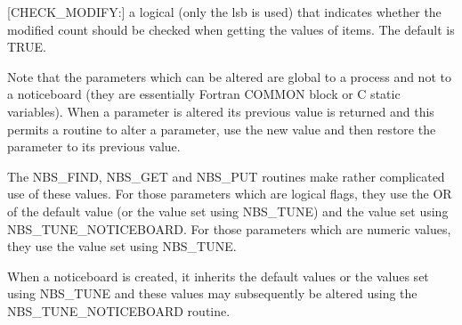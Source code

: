 \begin{small}
{{      [CHECK\_MODIFY:] a logical (only the lsb is used) that indicates whether
         the modified count should be checked when getting the values of items.
         The default is TRUE.

      Note that the parameters which can be altered are global to a process and
      not to a noticeboard (they are essentially Fortran COMMON block or C
      static variables). When a parameter is altered its previous value is
      returned and this permits a routine to alter a parameter, use the new
      value and then restore the parameter to its previous value.

      The NBS\_FIND, NBS\_GET and NBS\_PUT routines make rather complicated use of
      these values. For those parameters which are logical flags, they use
      the OR of the default value (or the value set using NBS\_TUNE) and the
      value set using NBS\_TUNE\_NOTICEBOARD. For those parameters which are
      numeric values, they use the value set using NBS\_TUNE.

      When a noticeboard is created, it inherits the default values or the
      values set using NBS\_TUNE and these values may subsequently be altered
      using the \\
      NBS\_TUNE\_NOTICEBOARD routine.
   }

}
\end{small}
